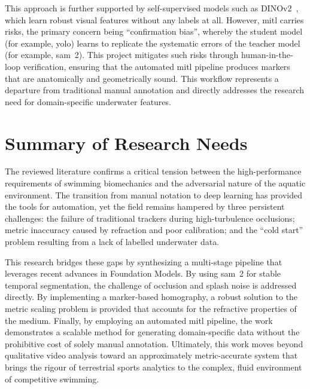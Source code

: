 This approach is further supported by self-supervised models such as
DINOv2~\cite{oquab2023dinov2}, which learn robust visual features without any labels at all.
However, \gls{mitl} carries risks, the primary concern being ``confirmation bias'', whereby the
student model (for example, \gls{yolo}) learns to replicate the systematic errors of the teacher model
(for example, \gls{sam}~2). This project mitigates such risks through human-in-the-loop verification,
ensuring that the automated \gls{mitl} pipeline produces markers that are anatomically and
geometrically sound. This workflow represents a departure from traditional manual annotation and
directly addresses the research need for domain-specific underwater features.

\section{Summary of Research Needs}
The reviewed literature confirms a critical tension between the high-performance requirements of
swimming biomechanics and the adversarial nature of the aquatic environment. The transition from
manual notation to deep learning has provided the tools for automation, yet the field remains
hampered by three persistent challenges: the failure of traditional trackers during
high-turbulence occlusions; metric inaccuracy caused by refraction and poor calibration; and the
``cold start'' problem resulting from a lack of labelled underwater data.

This research bridges these gaps by synthesizing a multi-stage pipeline that leverages recent
advances in Foundation Models. By using \gls{sam}~2 for stable temporal segmentation, the challenge of
occlusion and splash noise is addressed directly. By implementing a marker-based homography, a
robust solution to the metric scaling problem is provided that accounts for the refractive
properties of the medium. Finally, by employing an automated \gls{mitl} pipeline, the work demonstrates
a scalable method for generating domain-specific data without the prohibitive cost of solely manual
annotation. Ultimately, this work moves beyond qualitative video analysis toward an approximately metric-accurate
system that brings the rigour of terrestrial sports analytics to the complex, fluid environment
of competitive swimming.